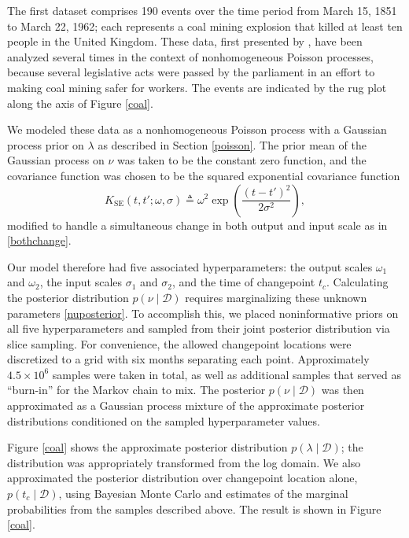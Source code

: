 \documentclass{article}
\newcommand{\deq}{\triangleq}
\newcommand{\cm}[1]{\mathcal{#1}}
\newcommand{\data}{\cm{D}}
\newcommand{\given}{\mid}
\begin{document}
The first dataset comprises 190 events over the time period from March
15, 1851 to March 22, 1962; each represents a coal mining explosion
that killed at least ten people in the United Kingdom.  These data,
first presented by \citet{jarrett}, have been analyzed several times
in the context of nonhomogeneous Poisson processes, because several
legislative acts were passed by the parliament in an effort to making
coal mining safer for workers.  The events are indicated by the rug
plot along the axis of Figure \ref{coal}.

We modeled these data as a nonhomogeneous Poisson process with a
Gaussian process prior on $\lambda$ as described in Section
\ref{poisson}.  The prior mean of the Gaussian process on $\nu$ was
taken to be the constant zero function, and the covariance function
was chosen to be the squared exponential covariance function
\begin{equation}
  \label{sqdexp}
  K_{\text{SE}}(t, t'; \omega, \sigma)
  \deq
  \omega^2
  \exp
  \left(
  \frac{(t - t')^2}{2\sigma^2}
  \right),
\end{equation}
modified to handle a simultaneous change in both output and input
scale as in \eqref{bothchange}.

Our model therefore had five associated hyperparameters: the output
scales $\omega_1$ and $\omega_2$, the input scales $\sigma_1$ and
$\sigma_2$, and the time of changepoint $t_c$.  Calculating the
posterior distribution $p(\nu \given \data)$ requires marginalizing
these unknown parameters \eqref{nuposterior}.  To accomplish this, we
placed noninformative priors on all five hyperparameters and sampled
from their joint posterior distribution via slice sampling.  For
convenience, the allowed changepoint locations were discretized to a
grid with six months separating each point.  Approximately $4.5 \times
10^6$ samples were taken in total, as well as additional samples that
served as ``burn-in'' for the Markov chain to mix.  The posterior
$p(\nu \given \data)$ was then approximated as a Gaussian process
mixture of the approximate posterior distributions conditioned on the
sampled hyperparameter values.

Figure \ref{coal} shows the approximate posterior
distribution $p(\lambda \given \data)$; the distribution was
appropriately transformed from the log domain.  We also approximated
the posterior distribution over changepoint location alone, $p(t_c
\given \data)$, using Bayesian Monte Carlo and estimates of the
marginal probabilities from the samples described above.  The result
is shown in Figure \ref{coal}.
\end{document}
